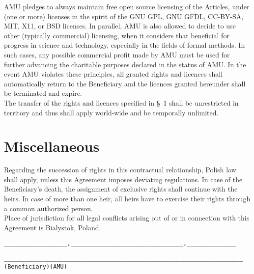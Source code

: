 \A AMU pledges to always maintain free open source licensing of the
Articles, under (one or more) licenses in the
spirit of the GNU GPL, GNU GFDL, CC-BY-SA, MIT, X11, or BSD licenses.
In parallel, AMU is also allowed to
decide to use other (typically commercial) licensing, when it
considers that beneficial for progress in science and technology,
especially in the fields of formal methods. In such cases, any
possible commercial profit made by AMU must be used for further
advancing the charitable purposes declared in the status of AMU. In
the event AMU violates these principles, all granted rights and
licences shall automatically return to the Beneficiary and the
licences granted hereunder shall be terminated and expire.\\


\A The transfer of the rights and licences specified in {\S}~1 shall
be unrestricted in territory and thus shall apply world-wide and be
temporally unlimited.

\section{Miscellaneous}
\A Regarding the succession of rights in this contractual
relationship, Polish law shall apply, unless this Agreement imposes
deviating regulations. In case of the Beneficiary's death, the
assignment of exclusive rights shall continue with the heirs. In case
of more than one heir, all heirs have to exercise their rights through
a common authorized person.\\

\A Place of jurisdiction for all legal conflicts arising out of or in
connection with this Agreement is Bialystok, Poland.\\

\enlargethispage{2cm}
\vspace{3cm}
\begin{alltt}
__________________, ______________    __________________, ______________




__________________________________    __________________________________
           (Beneficiary)                         (AMU)
\end{alltt}


